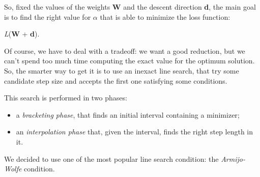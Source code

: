 			So, fixed the values of the weights \textbf{W} and the descent direction \textbf{d}, the main goal is to find the right value for $\alpha$ that is able to minimize the loss function:

			 \begin{mini}
			   {\alpha}{\textit{L}(\textbf{W} + \alpha\textbf{d}).}{}{}
			 \end{mini}

			Of course, we have to deal with a tradeoff: we want a good reduction, but we can't spend too much time computing the exact value for the optimum solution. So, the smarter way to get it is to use an inexact line search, that try some candidate step size and accepts the first one satisfying some conditions.

			This search is performed in two phases:
			\begin{itemize}
			\item a \textit{bracketing phase}, that finds an initial interval containing a minimizer;
			\item an \textit{interpolation phase} that, given the interval, finds the right step length in it.
			\end{itemize}

			We decided to use one of the most popular line search condition: the \textit{Armijo-Wolfe} condition.

